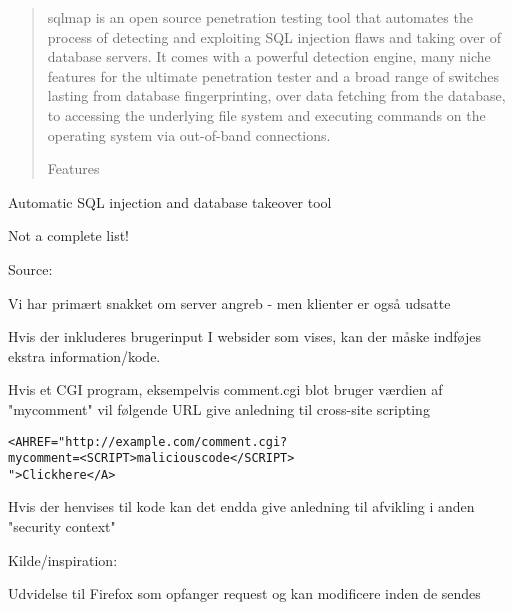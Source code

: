 \documentclass[Screen16to9,17pt]{foils}
\begin{document}
\begin{list2}

\begin{quote}\small
sqlmap is an open source penetration testing tool that automates the process of detecting and exploiting SQL injection flaws and taking over of database servers. It comes with a powerful detection engine, many niche features for the ultimate penetration tester and a broad range of switches lasting from database fingerprinting, over data fetching from the database, to accessing the underlying file system and executing commands on the operating system via out-of-band connections.

Features
\end{quote}

\begin{list1}
\item Automatic SQL injection and database takeover tool
\end{list1}




Not a complete list!

Source: 


Vi har primært snakket om server angreb - men klienter er også udsatte

\begin{list1}
\item Hvis der inkluderes brugerinput I websider som vises, kan
der måske indføjes ekstra information/kode.
\item Hvis et CGI program, eksempelvis comment.cgi blot bruger værdien af "mycomment" vil
følgende URL give anledning til cross-site scripting
\begin{alltt}
<A HREF="http://example.com/comment.cgi?
mycomment=<SCRIPT>malicious code</SCRIPT>
">Click here</A>
\end{alltt}
\item Hvis der henvises til kode kan det endda give anledning til
afvikling i anden "security context"
\item Kilde/inspiration:
\end{list1}




Udvidelse til Firefox som opfanger request og kan modificere inden de sendes\\




\end{list2}
\end{document}
